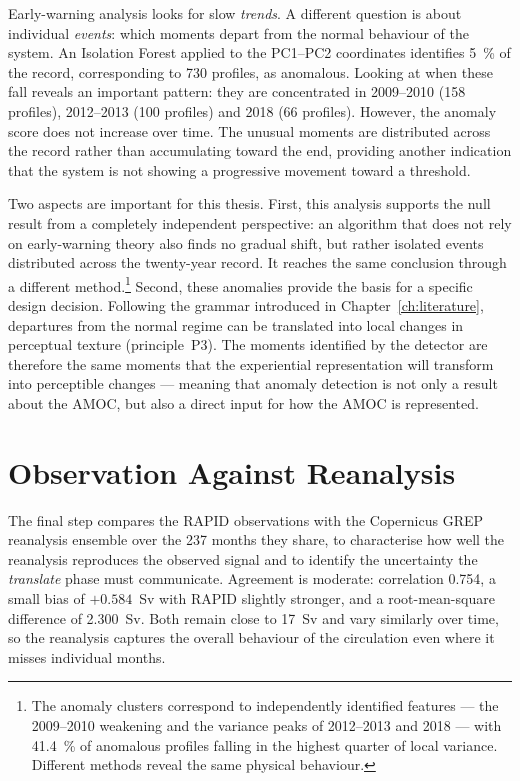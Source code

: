 Early-warning analysis looks for slow \emph{trends}. A different question is about individual \emph{events}: which moments depart from the normal behaviour of the system. An Isolation Forest applied to the PC1--PC2 coordinates identifies \SI{5}{\percent} of the record, corresponding to 730 profiles, as anomalous. Looking at when these fall reveals an important pattern: they are concentrated in 2009--2010 (158 profiles), 2012--2013 (100 profiles) and 2018 (66 profiles). However, the anomaly score does not increase over time. The unusual moments are distributed across the record rather than accumulating toward the end, providing another indication that the system is not showing a progressive movement toward a threshold.



Two aspects are important for this thesis. First, this analysis supports the null result from a completely independent perspective: an algorithm that does not rely on early-warning theory also finds no gradual shift, but rather isolated events distributed across the twenty-year record. It reaches the same conclusion through a different method.\footnote{The anomaly clusters correspond to independently identified features --- the 2009--2010 weakening and the variance peaks of 2012--2013 and 2018 --- with \SI{41.4}{\percent} of anomalous profiles falling in the highest quarter of local variance. Different methods reveal the same physical behaviour.} Second, these anomalies provide the basis for a specific design decision. Following the grammar introduced in Chapter~\ref{ch:literature}, departures from the normal regime can be translated into local changes in perceptual texture (principle~P3). The moments identified by the detector are therefore the same moments that the experiential representation will transform into perceptible changes --- meaning that anomaly detection is not only a result about the AMOC, but also a direct input for how the AMOC is represented.

\section{Observation Against Reanalysis}
\label{sec:detect-copernicus}

The final step compares the RAPID observations with the Copernicus GREP reanalysis ensemble over the 237 months they share, to characterise how well the reanalysis reproduces the observed signal and to identify the uncertainty the \emph{translate} phase must communicate. Agreement is moderate: correlation 0.754, a small bias of $+0.584$~Sv with RAPID slightly stronger, and a root-mean-square difference of 2.300~Sv. Both remain close to 17~Sv and vary similarly over time, so the reanalysis captures the overall behaviour of the circulation even where it misses individual months.

